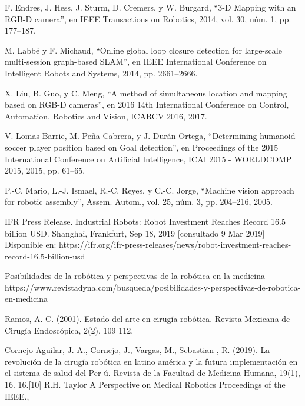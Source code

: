 \documentclass[12pt]{book} %
\begin{document}
\begin{thebibliography}{}
	 F. Endres, J. Hess, J. Sturm, D. Cremers, y W. Burgard, “3-D Mapping with an RGB-D camera”, en IEEE Transactions on Robotics, 2014, vol. 30, núm. 1, pp. 177–187.
	
	 M. Labbé y F. Michaud, “Online global loop closure detection for large-scale multi-session graph-based SLAM”, en IEEE International Conference on Intelligent Robots and Systems, 2014, pp. 2661–2666.
	
	 X. Liu, B. Guo, y C. Meng, “A method of simultaneous location and mapping based on RGB-D cameras”, en 2016 14th International Conference on Control, Automation, Robotics and Vision, ICARCV 2016, 2017.
	
	 V. Lomas-Barrie, M. Peña-Cabrera, y J. Durán-Ortega, “Determining humanoid soccer player position based on Goal detection”, en Proceedings of the 2015 International Conference on Artificial Intelligence, ICAI 2015 - WORLDCOMP 2015, 2015, pp. 61–65.

	
	 P.-C. Mario, L.-J. Ismael, R.-C. Reyes, y C.-C. Jorge, “Machine vision approach for robotic assembly”, Assem. Autom., vol. 25, núm. 3, pp. 204–216, 2005.

	 IFR Press Release. Industrial Robots: Robot Investment Reaches Record 16.5 billion USD. Shanghai, Frankfurt, Sep 18, 2019 [consultado 9 Mar 2019] Disponible en: https://ifr.org/ifr-press-releases/news/robot-investment-reaches-record-16.5-billion-usd

	 Posibilidades de la robótica y perspectivas de la robótica en la medicina https://www.revistadyna.com/busqueda/posibilidades-y-perspectivas-de-robotica-en-medicina
	
	 Ramos, A. C. (2001). Estado del arte en cirugía robótica. Revista Mexicana de Cirugía Endoscópica, 2(2), 109 112.
	
	 Cornejo Aguilar, J. A., Cornejo, J., Vargas, M.,  Sebastian , R. (2019). La revolución de la cirugía robótica en latino américa y la futura implementación en el sistema de salud del Per ú. Revista de la Facultad de Medicina Humana, 19(1), 16. 16.[10] R.H. Taylor A Perspective on Medical Robotics Proceedings of the IEEE., 
	
\end{thebibliography}
\end{document}
